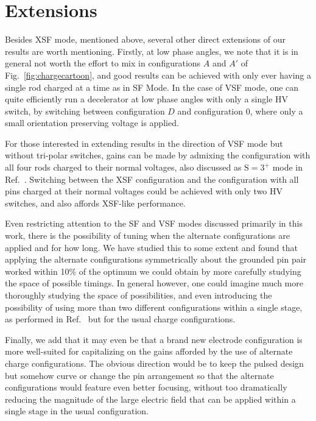 \documentclass[%
 reprint,
 amsmath,amssymb,
 aps,
pra,
]{revtex4-1}
\begin{document}
\section{Extensions}
Besides XSF mode, mentioned above, several other direct extensions of our results are worth mentioning. Firstly, at low phase angles, we note that it is in general not worth the effort to mix in configurations $A$ and $A'$ of Fig.~\ref{fig:chargecartoon}, and good results can be achieved with only ever having a single rod charged at a time as in SF Mode. In the case of VSF mode, one can quite efficiently run a decelerator at low phase angles with only a single HV switch, by switching between configuration $D$ and configuration $0$, where only a small orientation preserving voltage is applied.

For those interested in extending results in the direction of VSF mode but without tri-polar switches, gains can be made by admixing the configuration with all four rods charged to their normal voltages, also discussed as $\text{S}=3^+$ mode in Ref.~\cite{HudsonThesis2006}. Switching between the XSF configuration and the configuration with all pins charged at their normal voltages could be achieved with only two HV switches, and also affords XSF-like performance.

Even restricting attention to the SF and VSF modes discussed primarily in this work, there is the possibility of tuning when the alternate configurations are applied and for how long. 
We have studied this to some extent and found that applying the alternate configurations symmetrically about the grounded pin pair worked within 10\% of the optimum we could obtain by more carefully studying the space of possible timings.
In general however, one could imagine much more thoroughly studying the space of possibilities, and even introducing the possibility of using more than two different configurations within a single stage, as performed in Ref.~\cite{Zhang2016} but for the usual charge configurations.

Finally, we add that it may even be that a brand new electrode configuration is more well-suited for capitalizing on the gains afforded by the use of alternate charge configurations. The obvious direction would be to keep the pulsed design but somehow curve or change the pin arrangement so that the alternate configurations would feature even better focusing, without too dramatically reducing the magnitude of the large electric field that can be applied within a single stage in the usual configuration.




\end{document}
